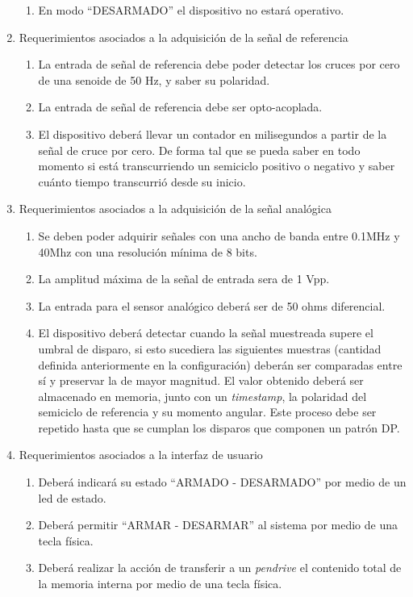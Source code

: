 \documentclass[11pt]{charter}
\begin{document}
\begin{enumerate}
\begin{enumerate}
	\item En modo “DESARMADO” el dispositivo no estará operativo.
	\end{enumerate}
\item Requerimientos asociados a la adquisición de la señal de referencia
	\begin{enumerate}
	\item La entrada de señal de referencia debe poder detectar los cruces por cero de una senoide de 50 Hz, y saber su polaridad.
	\item La entrada de señal de referencia debe ser opto-acoplada.
	\item El dispositivo deberá llevar un contador en milisegundos a partir de la señal de cruce por cero. De forma tal que se pueda saber en todo momento si está transcurriendo un semiciclo positivo o negativo y saber cuánto tiempo transcurrió desde su inicio.
	\end{enumerate}
\item Requerimientos asociados a la adquisición de la señal analógica
	\begin{enumerate}
	\item Se deben poder adquirir señales con una ancho de banda entre 0.1MHz y 40Mhz con una resolución mínima de 8 bits.
	\item La amplitud máxima de la señal de entrada sera de 1 Vpp.
	\item La entrada para el sensor analógico deberá ser de 50 ohms diferencial.
 	\item El dispositivo deberá detectar cuando la señal muestreada supere el umbral de disparo, si esto sucediera las siguientes muestras (cantidad definida anteriormente en la configuración) deberán ser comparadas entre sí y preservar la de mayor magnitud. El valor obtenido deberá ser almacenado en memoria, junto con un \textit{timestamp}, la polaridad del semiciclo de referencia y su momento angular. Este proceso debe ser repetido hasta que se cumplan los disparos que componen un patrón DP.
	\end{enumerate}
\item Requerimientos asociados a la interfaz de usuario
	\begin{enumerate}
	\item Deberá indicará su estado “ARMADO - DESARMADO” por medio de un led de estado.
	\item Deberá permitir “ARMAR - DESARMAR” al sistema por medio de una tecla física.
	\item Deberá realizar la acción de transferir a un \textit{pendrive} el contenido total de la memoria interna por medio de una tecla física.

\end{enumerate}
\end{enumerate}
\end{document}
